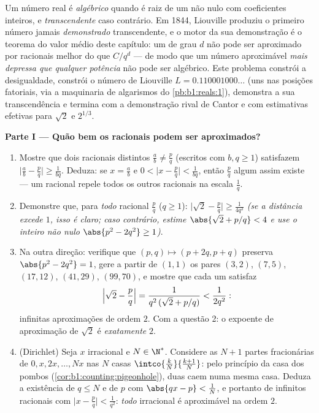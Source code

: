 \begin{problem}
\label{pb:b1:derivative:1}
Um número real é \emph{algébrico} quando é raiz de um  não
nulo com coeficientes inteiros, e \emph{transcendente}
caso contrário. Em 1844, Liouville produziu o primeiro número jamais
\emph{demonstrado} transcendente, e o motor da sua demonstração é o
teorema do valor médio deste capítulo: um  de grau $d$
não pode ser aproximado por racionais melhor do que $C/q^d$ --- de modo
que um número aproximável \emph{mais depressa que qualquer potência}
não pode ser algébrico. Este problema constrói a desigualdade, constrói
o número de Liouville $L = 0.110001000\dots$ (uns nas posições
fatoriais, via a maquinaria de algarismos do \cref{pb:b1:reals:1}),
demonstra a sua transcendência e termina com a demonstração rival de
Cantor e com estimativas efetivas para $\sqrt2$ e
$2^{1/3}$.

\medskip
\noindent\textbf{Parte I --- Quão bem os racionais podem ser
aproximados?}
\begin{enumerate}
  \item Mostre que dois racionais distintos $\frac ab \neq \frac pq$
        (escritos com $b, q \geq 1$) satisfazem $\bigl|\frac ab -
        \frac pq\bigr| \geq \frac{1}{bq}$. Deduza: se $x =
        \frac ab$ e $0 < \bigl|x - \frac pq\bigr| <
        \frac{1}{bq}$, então $\frac pq$ algum assim existe --- um racional
        repele todos os outros racionais na escala $\frac 1q$.
  \item Demonstre que, para \emph{todo} racional $\frac pq$ ($q \geq
        1$): $\bigl|\sqrt2 - \frac pq\bigr| \geq
        \frac{1}{4q^2}$ \emph{(se a distância excede $1$, isso é
        claro; caso contrário, estime $\abs{\sqrt2 + p/q} < 4$ e
        use o inteiro não nulo $\abs{p^2 - 2q^2} \geq 1$)}.
  \item Na outra direção: verifique que $(p, q) \mapsto (p +
        2q, p + q)$ preserva $\abs{p^2 - 2q^2} = 1$, gere
        a partir de $(1,1)$ os pares $(3,2)$, $(7,5)$, $(17,12)$,
        $(41,29)$, $(99,70)$, e mostre que cada um satisfaz
        \[
        \Bigl|\sqrt2 - \frac pq\Bigr| =
        \frac{1}{q^2\,(\sqrt2 + p/q)} < \frac{1}{2q^2} :
        \]
        infinitas aproximações de ordem $2$. Com a
        questão 2: o expoente de aproximação de $\sqrt 2$ é
        \emph{exatamente} $2$.
  \item (Dirichlet) Seja $x$ irracional e $N \in \N^*$.
        Considere as $N + 1$ partes fracionárias de $0, x, 2x,
        \dots, Nx$ nas $N$ casas $\intco{\frac kN}{\frac{k +
        1}{N}}$: pelo princípio da casa dos pombos
        (\cref{cor:b1:counting:pigeonhole}), duas caem numa mesma casa.
        Deduza a existência de $q \leq N$ e de $p$ com $\abs{qx - p} <
        \frac 1N$, e portanto de infinitos racionais com
        $\bigl|x - \frac pq\bigr| < \frac{1}{q^2}$: \emph{todo}
        irracional é aproximável na ordem $2$.
\end{enumerate}


\end{problem}
